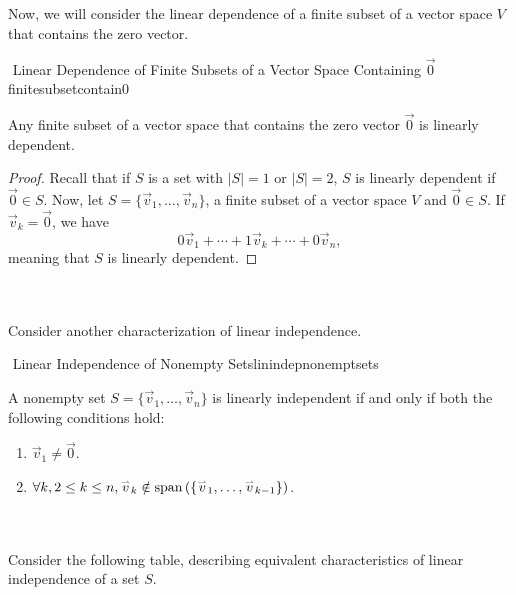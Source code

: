         \vphantom
        \\
        \\
        Now, we will consider the linear dependence of a finite subset of a vector space \(V\) that contains the zero vector.
        \begin{theorem}{\Stop\,\,Linear Dependence of Finite Subsets of a Vector Space Containing \(\vec{0}\)}{finitesubsetcontain0}
            
            Any finite subset of a vector space that contains the zero vector \(\vec{0}\) is linearly dependent.
            \begin{proof}
                Recall that if \(S\) is a set with \(|S|=1\) or \(|S|=2\), \(S\) is linearly dependent if \(\vec{0}\in S\). Now, let \(S=\{\vec{v}_1,\ldots,\vec{v}_n\}\), a finite subset of a vector space \(V\) and \(\vec{0}\in S\). If \(\vec{v}_k=\vec{0}\), we have
                \begin{equation*}
                    0\vec{v}_1+\cdots+1\vec{v}_k+\cdots+0\vec{v}_n,
                \end{equation*}
                meaning that \(S\) is linearly dependent.
            \end{proof}

        \end{theorem}
        \pagebreak
        \vphantom
        \\
        \\
        Consider another characterization of linear independence.
        \begin{theorem}{\Stop\,\,Linear Independence of Nonempty Sets}{linindepnonemptsets}
        
            A nonempty set \(S=\{\vec{v}_1,\ldots,\vec{v}_n\}\) is linearly independent if and only if both the following conditions hold:
            \begin{enumerate}
                \item \(\vec{v}_1\neq\vec{0}\).
                \item \(\forall k,2\leq k \leq n, \overset{_{\rightharpoonup}}{v}_k\notin\text{span\,}(\{\overset{_{\rightharpoonup}}{v}_1,\ldots,\overset{_{\rightharpoonup}}{v}_{k-1}\})\).
            \end{enumerate}
        
        \end{theorem}
        \vphantom
        \\
        \\
        Consider the following table, describing equivalent characteristics of linear independence of a set \(S\).
